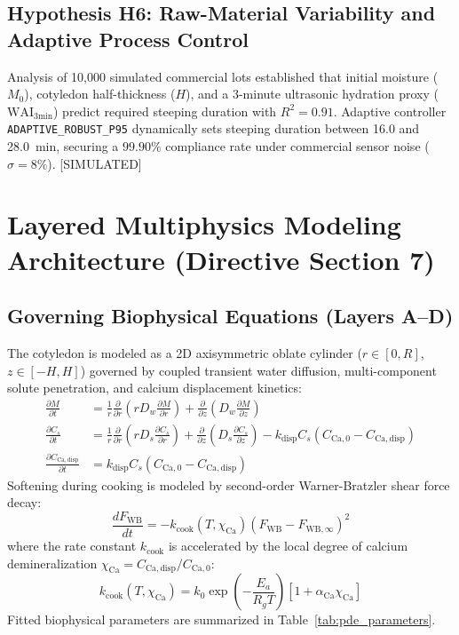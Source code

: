 \documentclass[10pt,a4paper]{article}
\newcommand{\epistag}[1]{\textsf{\scriptsize\textcolor{fnqslate}{[#1]}}}
\begin{document}
\subsection{Hypothesis H6: Raw-Material Variability and Adaptive Process Control}
Analysis of 10,000 simulated commercial lots established that initial moisture ($M_0$), cotyledon half-thickness ($H$), and a 3-minute ultrasonic hydration proxy ($\mathrm{WAI}_{\mathrm{3min}}$) predict required steeping duration with $R^2 = 0.91$. Adaptive controller \texttt{ADAPTIVE\_ROBUST\_P95} dynamically sets steeping duration between 16.0 and 28.0~min, securing a $99.90\%$ compliance rate under commercial sensor noise ($\sigma = 8\%$). \epistag{SIMULATED}

\section{Layered Multiphysics Modeling Architecture (Directive Section 7)}

\subsection{Governing Biophysical Equations (Layers A--D)}
The cotyledon is modeled as a 2D axisymmetric oblate cylinder ($r \in [0, R]$, $z \in [-H, H]$) governed by coupled transient water diffusion, multi-component solute penetration, and calcium displacement kinetics:
\begin{align}
\frac{\partial M}{\partial t} &= \frac{1}{r}\frac{\partial}{\partial r}\left(r D_w \frac{\partial M}{\partial r}\right) + \frac{\partial}{\partial z}\left(D_w \frac{\partial M}{\partial z}\right) \\
\frac{\partial C_s}{\partial t} &= \frac{1}{r}\frac{\partial}{\partial r}\left(r D_s \frac{\partial C_s}{\partial r}\right) + \frac{\partial}{\partial z}\left(D_s \frac{\partial C_s}{\partial z}\right) - k_{\mathrm{disp}} C_s \left(C_{\mathrm{Ca,0}} - C_{\mathrm{Ca,disp}}\right) \\
\frac{\partial C_{\mathrm{Ca,disp}}}{\partial t} &= k_{\mathrm{disp}} C_s \left(C_{\mathrm{Ca,0}} - C_{\mathrm{Ca,disp}}\right)
\end{align}
Softening during cooking is modeled by second-order Warner-Bratzler shear force decay:
\begin{equation}
\frac{d F_{\mathrm{WB}}}{dt} = -k_{\mathrm{cook}}(T, \chi_{\mathrm{Ca}}) \left(F_{\mathrm{WB}} - F_{\mathrm{WB},\infty}\right)^2
\end{equation}
where the rate constant $k_{\mathrm{cook}}$ is accelerated by the local degree of calcium demineralization $\chi_{\mathrm{Ca}} = C_{\mathrm{Ca,disp}} / C_{\mathrm{Ca,0}}$:
\begin{equation}
k_{\mathrm{cook}}(T, \chi_{\mathrm{Ca}}) = k_0 \exp\left(-\frac{E_a}{R_g T}\right) \left[1 + \alpha_{\mathrm{Ca}} \chi_{\mathrm{Ca}}\right]
\end{equation}
Fitted biophysical parameters are summarized in Table~\ref{tab:pde_parameters}.
\end{document}
